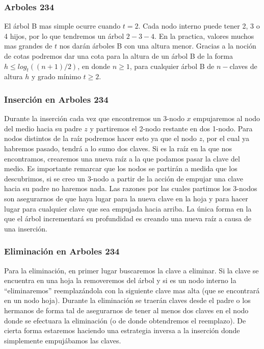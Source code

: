 \subsubsection{Arboles 234}
El \'arbol B mas simple ocurre cuando $t=2$. Cada nodo interno puede tener 2, 3 o 4 hijos, por lo que tendremos un \'arbol $2-3-4$. En la practica, valores muchos mas grandes de $t$ nos dar\'an \'arboles B con una altura menor. Gracias a la noci\'on de cotas podremos dar una cota para la altura de un \'arbol B de la forma $h \leq log_t((n+1)/2)$, en donde $n \geq 1$, para cualquier \'arbol B de $n-$claves de altura $h$ y grado m\'inimo $t \geq 2$.

\subsubsection{Inserci\'on en Arboles 234}

Durante la inserci\'on cada vez que encontremos un 3-nodo $x$ empujaremos al nodo del medio hacia su padre $z$ y partiremos el 2-nodo restante en dos 1-nodo. Para nodos distintos de la ra\'iz podremos hacer esto ya que el nodo $z$, por el cual ya habremos pasado, tendr\'a a lo sumo dos claves.  Si es la ra\'iz en la que nos encontramos, crearemos una nueva ra\'iz a la que podamos pasar la clave del medio. Es importante remarcar que los nodos se partir\'an a medida que los descubrimos, si se creo un 3-nodo a partir de la acci\'on de empujar una clave hacia su padre no haremos nada. Las razones por las cuales partimos los 3-nodos son asegurarnos de que haya lugar para la nueva clave en la hoja y para hacer lugar para cualquier clave que sea empujada hacia arriba. La \'unica forma en la que el \'arbol incrementar\'a su profundidad es creando una nueva ra\'iz a causa de una inserci\'on.

\subsubsection{Eliminaci\'on en Arboles 234}

Para la eliminaci\'on, en primer lugar buscaremos la clave a eliminar. Si la clave se encuentra en una hoja la removeremos del \'arbol y si es un nodo interno la ``eliminaremos'' reemplaz\'andola con la siguiente clave mas alta (que se encontrar\'a en un nodo hoja).
Durante la eliminaci\'on se traer\'an claves desde el padre o los hermanos de forma tal de asegurarnos de tener al menos  dos claves en el nodo donde se efectuara la eliminaci\'on (o de donde obtendremos el reemplazo).
De cierta forma estaremos haciendo una estrategia inversa a la inserci\'on donde simplemente empuj\'abamos las claves.

